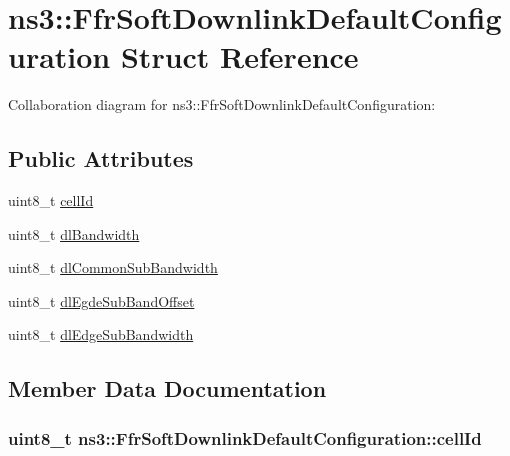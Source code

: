 \hypertarget{structns3_1_1FfrSoftDownlinkDefaultConfiguration}{}\section{ns3\+:\+:Ffr\+Soft\+Downlink\+Default\+Configuration Struct Reference}
\label{structns3_1_1FfrSoftDownlinkDefaultConfiguration}


Collaboration diagram for ns3\+:\+:Ffr\+Soft\+Downlink\+Default\+Configuration\+:
\subsection*{Public Attributes}
\begin{DoxyCompactItemize}
\item 
uint8\+\_\+t \hyperlink{structns3_1_1FfrSoftDownlinkDefaultConfiguration_a06f9e3b67c4a004e62b1d35adf55691f}{cell\+Id}
\item 
uint8\+\_\+t \hyperlink{structns3_1_1FfrSoftDownlinkDefaultConfiguration_a14bf3505b7ab44699188ed5b41837a8b}{dl\+Bandwidth}
\item 
uint8\+\_\+t \hyperlink{structns3_1_1FfrSoftDownlinkDefaultConfiguration_ac0df17738f6ce97b9eb9002fbf2700bc}{dl\+Common\+Sub\+Bandwidth}
\item 
uint8\+\_\+t \hyperlink{structns3_1_1FfrSoftDownlinkDefaultConfiguration_ad497c93a2b0b7b00aaa88641066e57bb}{dl\+Egde\+Sub\+Band\+Offset}
\item 
uint8\+\_\+t \hyperlink{structns3_1_1FfrSoftDownlinkDefaultConfiguration_a7819f2eade91790d9d4071d4b38791ee}{dl\+Edge\+Sub\+Bandwidth}
\end{DoxyCompactItemize}


\subsection{Member Data Documentation}
\subsubsection[{\texorpdfstring{cell\+Id}{cellId}}]{\setlength{\rightskip}{0pt plus 5cm}uint8\+\_\+t ns3\+::\+Ffr\+Soft\+Downlink\+Default\+Configuration\+::cell\+Id}\hypertarget{structns3_1_1FfrSoftDownlinkDefaultConfiguration_a06f9e3b67c4a004e62b1d35adf55691f}{}\label{structns3_1_1FfrSoftDownlinkDefaultConfiguration_a06f9e3b67c4a004e62b1d35adf55691f}
